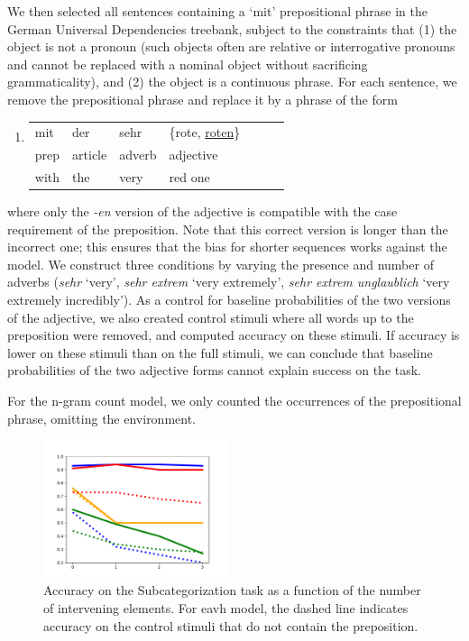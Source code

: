 We then selected all sentences containing a `mit' prepositional phrase in the German Universal Dependencies treebank, subject to the constraints that (1) the object is not a pronoun (such objects often are relative or interrogative pronouns and cannot be replaced with a nominal object without sacrificing grammaticality), and (2) the object is a continuous phrase.
For each sentence, we remove the prepositional phrase and replace it by a phrase of the form
\begin{enumerate}[label={(\arabic*)}]
	\item \begin{tabular}[t]{lllllll}
	mit & der & sehr& \{rote, \underline{roten}\} \\
	prep & article  & adverb & adjective \\
	with & the & very  & red one 
\end{tabular}
\end{enumerate}
where only the \emph{-en} version of the adjective is compatible with the case requirement of the preposition.
Note that this correct version is longer than the incorrect one; this ensures that the bias for shorter sequences works against the model.
We construct three conditions by varying the presence and number of adverbs (\emph{sehr} `very', \emph{sehr extrem} `very extremely', \emph{sehr extrem unglaublich} `very extremely incredibly').
As a control for baseline probabilities of the two versions of the adjective, we also created control stimuli where all words up to the preposition were removed, and computed accuracy on these stimuli.
If accuracy is lower on these stimuli than on the full stimuli, we can conclude that baseline probabilities of the two adjective forms cannot explain success on the task.

For the n-gram count model, we only counted the occurrences of the prepositional phrase, omitting the environment.

\begin{figure}
\includegraphics[width=0.48\textwidth]{figures/german-prep-with-control.pdf}
\caption{Accuracy on the Subcategorization task as a function of the number of intervening elements. For eavh model, the dashed line indicates accuracy on the control stimuli that do not contain the preposition.}\label{fig:prep}
\end{figure}

